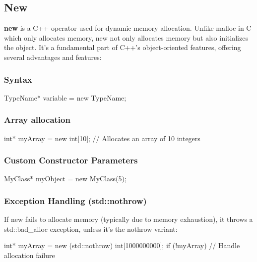 \documentclass{report}
\begin{document}
\begin{concept}
    \bigbreak \noindent 
    \subsection{New}
    \bigbreak \noindent 
    \begin{concept}
        \textbf{new} is a C++ operator used for dynamic memory allocation. Unlike malloc in C which only allocates memory, new not only allocates memory but also initializes the object. It's a fundamental part of C++'s object-oriented features, offering several advantages and features:
    \end{concept}
    \bigbreak \noindent 
    \subsubsection{Syntax}
    \bigbreak \noindent 
    \begin{cppcode}
    TypeName* variable = new TypeName;
    \end{cppcode}
    \bigbreak \noindent 
    \subsubsection{Array allocation}
    \bigbreak \noindent 
    \begin{cppcode}
    int* myArray = new int[10]; // Allocates an array of 10 integers
    \end{cppcode}
    \bigbreak \noindent 
    \subsubsection{Custom Constructor Parameters}
    \bigbreak \noindent 
    \begin{cppcode}
    MyClass* myObject = new MyClass(5);
    \end{cppcode}
    \bigbreak \noindent 
    \subsubsection{Exception Handling (std::nothrow)}
    \bigbreak \noindent 
    If new fails to allocate memory (typically due to memory exhaustion), it throws a std::bad\_alloc exception, unless it's the nothrow variant:
    \bigbreak \noindent 
    \begin{cppcode}
    int* myArray = new (std::nothrow) int[1000000000];
    if (!myArray) {
        // Handle allocation failure
    }
    \end{cppcode}

    \pagebreak 

\end{concept}
\end{document}
